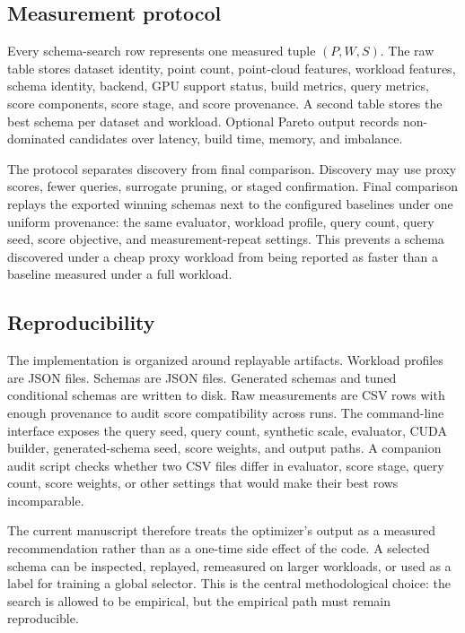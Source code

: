 \subsection{Measurement protocol}

Every schema-search row represents one measured tuple $(P,W,S)$. The raw table stores dataset identity, point count, point-cloud features, workload features, schema identity, backend, GPU support status, build metrics, query metrics, score components, score stage, and score provenance. A second table stores the best schema per dataset and workload. Optional Pareto output records non-dominated candidates over latency, build time, memory, and imbalance.

The protocol separates discovery from final comparison. Discovery may use proxy scores, fewer queries, surrogate pruning, or staged confirmation. Final comparison replays the exported winning schemas next to the configured baselines under one uniform provenance: the same evaluator, workload profile, query count, query seed, score objective, and measurement-repeat settings. This prevents a schema discovered under a cheap proxy workload from being reported as faster than a baseline measured under a full workload.

\subsection{Reproducibility}

The implementation is organized around replayable artifacts. Workload profiles are JSON files. Schemas are JSON files. Generated schemas and tuned conditional schemas are written to disk. Raw measurements are CSV rows with enough provenance to audit score compatibility across runs. The command-line interface exposes the query seed, query count, synthetic scale, evaluator, CUDA builder, generated-schema seed, score weights, and output paths. A companion audit script checks whether two CSV files differ in evaluator, score stage, query count, score weights, or other settings that would make their best rows incomparable.

The current manuscript therefore treats the optimizer's output as a measured recommendation rather than as a one-time side effect of the code. A selected schema can be inspected, replayed, remeasured on larger workloads, or used as a label for training a global selector. This is the central methodological choice: the search is allowed to be empirical, but the empirical path must remain reproducible.
